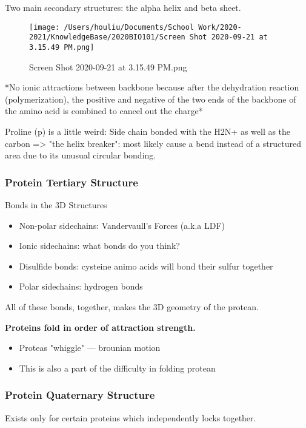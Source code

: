 \documentclass[letterpaper]{article}
\begin{document}
Two main secondary structures: the alpha helix and beta sheet.

\begin{figure}[htbp]
\centering
\texttt{[image: /Users/houliu/Documents/School Work/2020-2021/KnowledgeBase/2020BIO101/Screen Shot 2020-09-21 at 3.15.49 PM.png]}
\caption{Screen Shot 2020-09-21 at 3.15.49 PM.png}
\end{figure}

*No ionic attractions between backbone because after the dehydration
reaction (polymerization), the positive and negative of the two ends of
the backbone of the amino acid is combined to cancel out the charge*

Proline (p) is a little weird: Side chain bonded with the H2N+ as well
as the carbon => "the helix breaker": most likely cause a bend instead
of a structured area due to its unusual circular bonding.

\subsubsection{Protein Tertiary Structure}
\label{sec:org8ba0552}
Bonds in the 3D Structures

\begin{itemize}
\item Non-polar sidechains: Vandervaull's Forces (a.k.a LDF)
\item Ionic sidechains: what bonds do you think?
\item Disulfide bonds: cysteine animo acids will bond their sulfur together
\item Polar sidechains: hydrogen bonds
\end{itemize}

All of these bonds, together, makes the 3D geometry of the protean.

\textbf{Proteins fold in order of attraction strength.}

\begin{itemize}
\item Proteas "whiggle" --- brounian motion
\item This is also a part of the difficulty in folding protean
\end{itemize}

\subsubsection{Protein Quaternary Structure}
\label{sec:orgcde150e}
Exists only for certain proteins which independently locks together.
\end{document}
